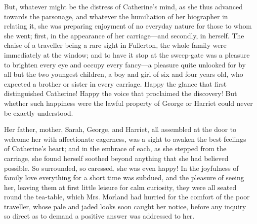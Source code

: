 But, whatever might be the distress of Catherine's mind, as she thus advanced towards the parsonage, and whatever the humiliation of her biographer in relating it, she was preparing enjoyment of no everyday nature for those to whom she went; first, in the appearance of her carriage---and secondly, in herself. The chaise of a traveller being a rare sight in Fullerton, the whole family were immediately at the window; and to have it stop at the sweep-gate was a pleasure to brighten every eye and occupy every fancy---a pleasure quite unlooked for by all but the two youngest children, a boy and girl of six and four years old, who expected a brother or sister in every carriage. Happy the glance that first distinguished Catherine! Happy the voice that proclaimed the discovery! But whether such happiness were the lawful property of George or Harriet could never be exactly understood.

Her father, mother, Sarah, George, and Harriet, all assembled at the door to welcome her with affectionate eagerness, was a sight to awaken the best feelings of Catherine's heart; and in the embrace of each, as she stepped from the carriage, she found herself soothed beyond anything that she had believed possible. So surrounded, so caressed, she was even happy! In the joyfulness of family love everything for a short time was subdued, and the pleasure of seeing her, leaving them at first little leisure for calm curiosity, they were all seated round the tea-table, which Mrs. Morland had hurried for the comfort of the poor traveller, whose pale and jaded looks soon caught her notice, before any inquiry so direct as to demand a positive answer was addressed to her.

